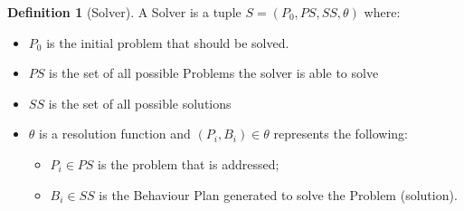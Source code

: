 \documentclass[journal]{IEEEtran}
\theoremstyle{definition}
\newtheorem{definition}{Definition}
\begin{document}
\begin{definition}[Solver]
A Solver is a tuple $S=(P_0, PS, SS, \theta)$ where:
\begin{itemize}
\item $P_0$ is the initial problem that should be solved.
\item $PS$ is the set of all possible Problems the solver is able to solve
\item $SS$ is the set of all possible solutions
\item $\theta$ is a resolution function and $(P_i, B_i) \in \theta$ represents the following:
\begin{itemize}
\item $P_i \in PS$ is the problem that is addressed;
\item $B_i \in SS$ is the  Behaviour Plan generated to solve the Problem (solution).
\end{itemize}
\end{itemize}
\end{definition}
\end{document}
